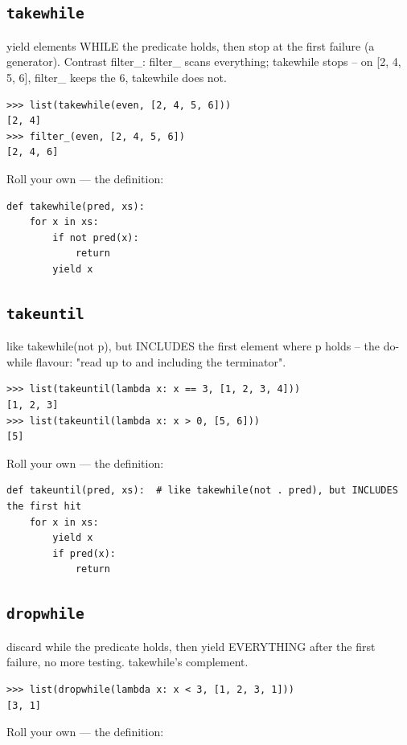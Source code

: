 \documentclass[10pt,letterpaper]{book}
\begin{document}
\subsection{\texttt{takewhile}}\label{def:takewhile}
yield elements WHILE the predicate holds, then stop at the first failure (a generator). Contrast filter\_: filter\_ scans everything; takewhile stops -- on [2, 4, 5, 6], filter\_ keeps the 6, takewhile does not.
\begin{lstlisting}[style=ex]
>>> list(takewhile(even, [2, 4, 5, 6]))
[2, 4]
>>> filter_(even, [2, 4, 5, 6])
[2, 4, 6]
\end{lstlisting}

Roll your own --- the definition:

\begin{lstlisting}[style=ex]
def takewhile(pred, xs):
    for x in xs:
        if not pred(x):
            return
        yield x
\end{lstlisting}
\subsection{\texttt{takeuntil}}\label{def:takeuntil}
like takewhile(not p), but INCLUDES the first element where p holds -- the do-while flavour: "read up to and including the terminator".
\begin{lstlisting}[style=ex]
>>> list(takeuntil(lambda x: x == 3, [1, 2, 3, 4]))
[1, 2, 3]
>>> list(takeuntil(lambda x: x > 0, [5, 6]))
[5]
\end{lstlisting}

Roll your own --- the definition:

\begin{lstlisting}[style=ex]
def takeuntil(pred, xs):  # like takewhile(not . pred), but INCLUDES the first hit
    for x in xs:
        yield x
        if pred(x):
            return
\end{lstlisting}
\subsection{\texttt{dropwhile}}\label{def:dropwhile}
discard while the predicate holds, then yield EVERYTHING after the first failure, no more testing. takewhile's complement.
\begin{lstlisting}[style=ex]
>>> list(dropwhile(lambda x: x < 3, [1, 2, 3, 1]))
[3, 1]
\end{lstlisting}

Roll your own --- the definition:
\end{document}
